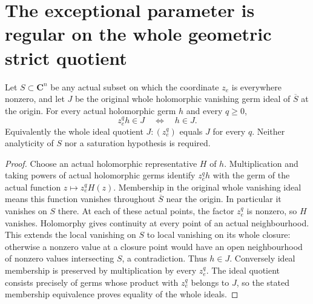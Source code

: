 \section{The exceptional parameter is regular on the whole geometric strict quotient}

\begin{theorem}
\label{hir:actual-off-hyperplane-closure-whole-ideal-saturation}
\leanok
Let $S\subset\mathbf C^n$ be any actual subset on which the coordinate
$z_e$ is everywhere nonzero, and let $J$ be the original whole holomorphic
vanishing germ ideal of $\overline S$ at the origin. For every actual
holomorphic germ $h$ and every $q\ge0$,
\[
 z_e^q h\in J\quad\Longleftrightarrow\quad h\in J.
\]
Equivalently the whole ideal quotient $J:(z_e^q)$ equals $J$ for every
$q$. Neither analyticity of $S$ nor a saturation hypothesis is required.
\end{theorem}
\begin{proof}
Choose an actual holomorphic representative $H$ of $h$. Multiplication
and taking powers of actual holomorphic germs identify $z_e^qh$ with
the germ of the actual function $z\mapsto z_e^qH(z)$. Membership in the
original whole vanishing ideal means this function vanishes throughout
$\overline S$ near the origin. In particular it vanishes on $S$ there.
At each of these actual points, the factor $z_e^q$ is nonzero, so $H$
vanishes. Holomorphy gives continuity at every point of an actual
neighbourhood. This extends the local vanishing on $S$ to local vanishing
on its whole closure: otherwise a nonzero value at a closure point would
have an open neighbourhood of nonzero values intersecting $S$, a
contradiction. Thus $h\in J$. Conversely ideal membership is preserved
by multiplication by every $z_e^q$. The ideal quotient consists precisely
of germs whose product with $z_e^q$ belongs to $J$, so the stated
membership equivalence proves equality of the whole ideals.
\end{proof}

